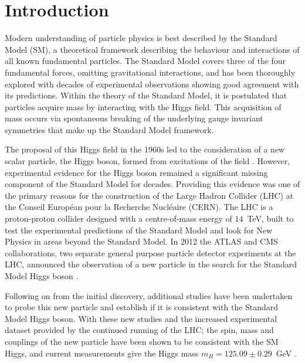 \chapter{Introduction}
\label{c:intro}

Modern understanding of particle physics is best described by the Standard Model (SM), a theoretical framework describing the behaviour and interactions of all known fundamental particles. The Standard Model covers three of the four fundamental forces, omitting gravitational interactions, and has been thoroughly explored with decades of experimental observations showing good agreement with its predictions. Within the theory of the Standard Model, it is postulated that particles acquire mass by interacting with the Higgs field. This acquisition of mass occurs via spontaneous breaking of the underlying gauge invariant symmetries that make up the Standard Model framework.

The proposal of this Higgs field in the 1960s led to the consideration of a new scalar particle, the Higgs boson, formed from excitations of the field \cite{gauge-boson-mass, higgs-1, higgs-2}. However, experimental evidence for the Higgs boson remained a significant missing component of the Standard Model for decades. Providing this evidence was one of the primary reasons for the construction of the Large Hadron Collider \cite{lhc} (LHC) at the  Conseil Europ\'{e}an pour la Recherche Nucl\'{e}aire (CERN). The LHC is a proton-proton collider designed with a centre-of-mass energy of $14$~TeV, built to test the experimental predictions of the Standard Model and look for New Physics in areas beyond the Standard Model. In 2012 the ATLAS and CMS collaborations, two separate general purpose particle detector experiments at the LHC, announced the observation of a new particle in the search for the Standard Model Higgs boson \cite{cmshiggs, atlashiggs}.

\newpage
Following on from the initial discovery, additional studies have been undertaken to probe this new particle and establish if it is consistent with the Standard Model Higgs boson. With these new studies and the increased experimental dataset provided by the continued running of the LHC; the spin, mass and couplings of the new particle have been shown to be consistent with the SM Higgs, and current measurements give the Higgs mass $m_H=125.09\pm0.29$~GeV \cite{higgsmeasure}.

